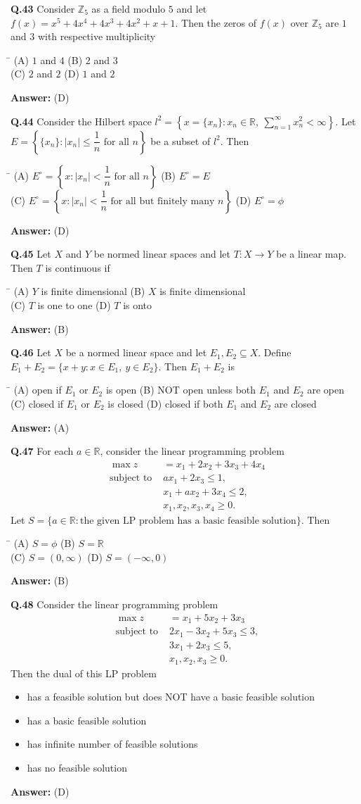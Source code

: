 \documentclass[11pt,a4paper]{article}
\newcommand{\optsfourA}[4]{%
  \begin{tabbing}
    \hspace{0.48\linewidth}\=\kill
    (A) #1 \> (B) #2 \\[2pt]
    (C) #3 \> (D) #4
  \end{tabbing}%
}
\newcommand{\optslistA}[4]{%
  \begin{itemize}
    \setlength{\itemsep}{2pt}\setlength{\parskip}{0pt}
    \item[(A)] #1
    \item[(B)] #2
    \item[(C)] #3
    \item[(D)] #4
  \end{itemize}%
}
\newcommand{\ans}[1]{\textbf{Answer:} #1\par\medskip}
\begin{document}
\textbf{Q.43} Consider $\mathbb{Z}_5$ as a field modulo $5$ and let $f(x) = x^5 + 4x^4 + 4x^3 + 4x^2 + x + 1$. Then the zeros of $f(x)$ over $\mathbb{Z}_5$ are $1$ and $3$ with respective multiplicity
\optsfourA{$1$ and $4$}{$2$ and $3$}{$2$ and $2$}{$1$ and $2$}
\ans{(D)}

\textbf{Q.44} Consider the Hilbert space $l^2 = \left\{x = \{x_n\} : x_n \in \mathbb{R},\ \sum_{n=1}^{\infty} x_n^2 < \infty\right\}$. Let $E = \left\{\{x_n\} : |x_n| \le \dfrac{1}{n} \text{ for all } n\right\}$ be a subset of $l^2$. Then
\optsfourA{$E^\circ = \left\{x : |x_n| < \dfrac{1}{n} \text{ for all } n\right\}$}{$E^\circ = E$}{$E^\circ = \left\{x : |x_n| < \dfrac{1}{n} \text{ for all but finitely many } n\right\}$}{$E^\circ = \phi$}
\ans{(D)}

\textbf{Q.45} Let $X$ and $Y$ be normed linear spaces and let $T : X \to Y$ be a linear map. Then $T$ is continuous if
\optsfourA{$Y$ is finite dimensional}{$X$ is finite dimensional}{$T$ is one to one}{$T$ is onto}
\ans{(B)}

\textbf{Q.46} Let $X$ be a normed linear space and let $E_1, E_2 \subseteq X$. Define $E_1 + E_2 = \{x + y : x \in E_1,\ y \in E_2\}$. Then $E_1 + E_2$ is
\optsfourA{open if $E_1$ or $E_2$ is open}{NOT open unless both $E_1$ and $E_2$ are open}{closed if $E_1$ or $E_2$ is closed}{closed if both $E_1$ and $E_2$ are closed}
\ans{(A)}

\textbf{Q.47} For each $a \in \mathbb{R}$, consider the linear programming problem
\begin{align*}
  \max z &= x_1 + 2x_2 + 3x_3 + 4x_4 \\
  \text{subject to } & ax_1 + 2x_3 \le 1, \\
                     & x_1 + ax_2 + 3x_4 \le 2, \\
                     & x_1, x_2, x_3, x_4 \ge 0.
\end{align*}
Let $S = \{a \in \mathbb{R} : \text{the given LP problem has a basic feasible solution}\}$. Then
\optsfourA{$S = \phi$}{$S = \mathbb{R}$}{$S = (0, \infty)$}{$S = (-\infty, 0)$}
\ans{(B)}

\textbf{Q.48} Consider the linear programming problem
\begin{align*}
  \max z &= x_1 + 5x_2 + 3x_3 \\
  \text{subject to } & 2x_1 - 3x_2 + 5x_3 \le 3, \\
                     & 3x_1 + 2x_3 \le 5, \\
                     & x_1, x_2, x_3 \ge 0.
\end{align*}
Then the dual of this LP problem
\optslistA{has a feasible solution but does NOT have a basic feasible solution}{has a basic feasible solution}{has infinite number of feasible solutions}{has no feasible solution}
\ans{(D)}
\end{document}

